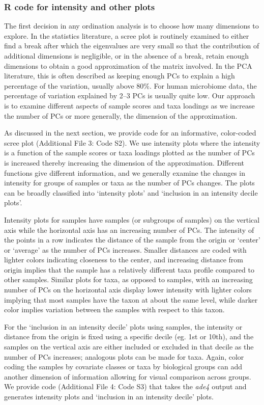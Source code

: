 \documentclass[doublespacing]{bmcart}
\begin{document}
\subsubsection*{R code for intensity and other plots}

The first decision in any ordination analysis is to choose how many dimensions to explore. In the statistics literature, a scree plot is routinely examined to either find a break after which the eigenvalues are very small so that the contribution of additional dimensions is negligible, or in the absence of a break, retain enough dimensions to obtain a good approximation of the matrix involved. In the PCA literature, this is often described as keeping enough PCs to explain a high percentage of the variation, usually above 80\%.  
For human microbiome data, the percentage of variation explained by 2--3 PCs is usually quite low. Our approach is to examine different aspects of sample scores and taxa loadings as we increase the number of PCs or more generally, the dimension of the approximation. 

As discussed in the next section, we provide code for an informative, color-coded scree plot (Additional File 3: Code S2).  We use intensity plots where the intensity is a function of the sample scores or taxa loadings plotted as the number of PCs is increased thereby increasing the dimension of the approximation. Different functions give different information, and we generally examine the changes in intensity for groups of samples or taxa as the number of PCs changes. The plots can be broadly classified into `intensity plots' and `inclusion in an intensity decile plots'. 

Intensity plots for samples have samples (or subgroups of samples) on the vertical axis while the horizontal axis has an increasing number of PCs. The intensity of the points in a row indicates the distance of the sample from the origin or `center'  or `average' as the number of PCs increases. Smaller distances are coded with lighter colors indicating closeness to the center, and increasing distance from origin implies that the sample has a relatively different taxa profile compared to other samples.  Similar plots for taxa, as opposed to samples, with an increasing number of PCs on the horizontal axis display lower intensity with lighter colors implying that most samples have the taxon at about the same level, while darker color implies variation between the samples with respect to this taxon. 

For the `inclusion in an intensity decile' plots using samples, the intensity or distance from the origin is fixed using a specific decile (eg. 1st or 10th), and the samples on the vertical axis are either included or excluded in that decile as the number of PCs increases; analogous plots can be made for taxa. Again, color coding the samples by covariate classes or taxa by biological groups can add another dimension of information allowing for visual comparison across groups. We provide code (Additional File 4: Code S3) that takes the {\it ade4} output and generates intensity plots and `inclusion in an intensity decile' plots.
\end{document}
